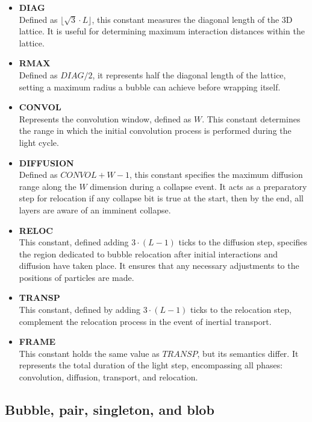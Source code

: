 \documentclass[12pt]{article}
\begin{document}
\begin{itemize}
\item \textbf{DIAG}\\
Defined as $ \lfloor \sqrt{3} \cdot L \rfloor$, this constant measures the diagonal length of the 3D lattice. It is useful for determining maximum interaction distances within the lattice.

\item \textbf{RMAX}\\
Defined as $DIAG/2$, it represents half the diagonal length of the lattice, setting a maximum radius a bubble can achieve before wrapping itself.

\item \textbf{CONVOL}\\
Represents the convolution window, defined as $W  $. This constant determines the range in which the initial convolution process is performed during the light cycle.

\item \textbf{DIFFUSION} \\
Defined as \(CONVOL + W - 1\), this constant specifies the maximum diffusion range along the \(W\) dimension during a collapse event. It acts as a preparatory step for relocation if any collapse bit is true at the start, then by the end, all layers are aware of an imminent collapse.

\item \textbf{RELOC}\\
This constant, defined adding $3\cdot(L-1)$ ticks to the diffusion step, specifies the region dedicated to bubble relocation after initial interactions and diffusion have taken place. It ensures that any necessary adjustments to the positions of particles are made.

\item \textbf{TRANSP} \\  
This constant, defined by adding \(3\cdot (L-1)\) ticks to the relocation step, complement the relocation process in the event of inertial transport.

\item \textbf{FRAME}\\
This constant holds the same value as $TRANSP$, but its semantics differ. It represents the total duration of the light step, encompassing all phases: convolution, diffusion, transport, and relocation.

\end{itemize}

\subsection{Bubble, pair, singleton, and blob} \label{subsec:pairs}
\end{document}
